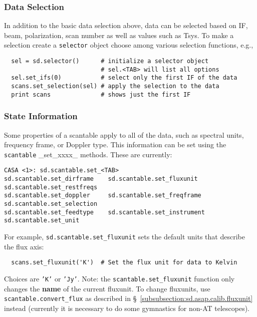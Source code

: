 \subsubsection{Data Selection}
\label{subsubsection:sd.asap.scantable.select}

In addition to the basic data selection above, data can be selected
based on IF, beam, polarization, scan number as well as values such as
Tsys.  To make a selection create a {\tt selector} object choose among various
selection functions, e.g., 

\small
\begin{verbatim}
  sel = sd.selector()      # initialize a selector object
                           # sel.<TAB> will list all options
  sel.set_ifs(0)           # select only the first IF of the data
  scans.set_selection(sel) # apply the selection to the data
  print scans              # shows just the first IF
\end{verbatim}
\normalsize

\subsubsection{State Information}
\label{subsubsection:sd.asap.scantable.state}

Some properties of a scantable apply to all of the data, such as
spectral units, frequency frame, or Doppler type. This
information can be set using the {\tt scantable} \_set\_xxxx\_
methods.  These are currently:
\small
\begin{verbatim}
CASA <1>: sd.scantable.set_<TAB>
sd.scantable.set_dirframe    sd.scantable.set_fluxunit    sd.scantable.set_restfreqs   
sd.scantable.set_doppler     sd.scantable.set_freqframe   sd.scantable.set_selection   
sd.scantable.set_feedtype    sd.scantable.set_instrument  sd.scantable.set_unit
\end{verbatim}
\normalsize

For example, {\tt sd.scantable.set\_fluxunit} sets the default units
that describe the flux axis:
\small
\begin{verbatim}
  scans.set_fluxunit('K')  # Set the flux unit for data to Kelvin
\end{verbatim}
\normalsize
Choices are {\tt 'K'} or {\tt 'Jy'}.
Note: the {\tt scantable.set\_fluxunit} function only changes the {\bf name}
of the current fluxunit. To change fluxunits, use 
{\tt scantable.convert\_flux} as described in 
\S~\ref{subsubsection:sd.asap.calib.fluxunit}
instead (currently it is necessary to do some gymnastics for non-AT
telescopes).

